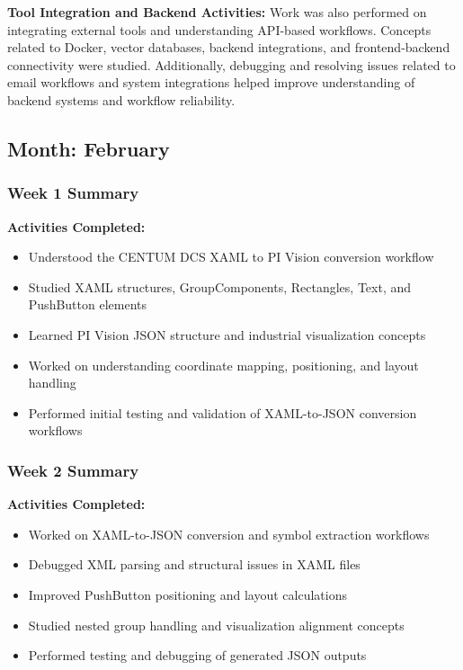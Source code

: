 \documentclass[12pt,a4paper]{report}
\begin{document}
\textbf{Tool Integration and Backend Activities:}
Work was also performed on integrating external tools and understanding API-based workflows. Concepts related to Docker, vector databases, backend integrations, and frontend-backend connectivity were studied. Additionally, debugging and resolving issues related to email workflows and system integrations helped improve understanding of backend systems and workflow reliability.

\newpage
\subsection*{Month: February}

\subsubsection*{Week 1 Summary}
\textbf{Activities Completed:}
\begin{itemize}[leftmargin=1.5cm]
    \item Understood the CENTUM DCS XAML to PI Vision conversion workflow
    \item Studied XAML structures, GroupComponents, Rectangles, Text, and PushButton elements
    \item Learned PI Vision JSON structure and industrial visualization concepts
    \item Worked on understanding coordinate mapping, positioning, and layout handling
    \item Performed initial testing and validation of XAML-to-JSON conversion workflows
\end{itemize}

\subsubsection*{Week 2 Summary}
\textbf{Activities Completed:}
\begin{itemize}[leftmargin=1.5cm]
    \item Worked on XAML-to-JSON conversion and symbol extraction workflows
    \item Debugged XML parsing and structural issues in XAML files
    \item Improved PushButton positioning and layout calculations
    \item Studied nested group handling and visualization alignment concepts
    \item Performed testing and debugging of generated JSON outputs
\end{itemize}
\end{document}
